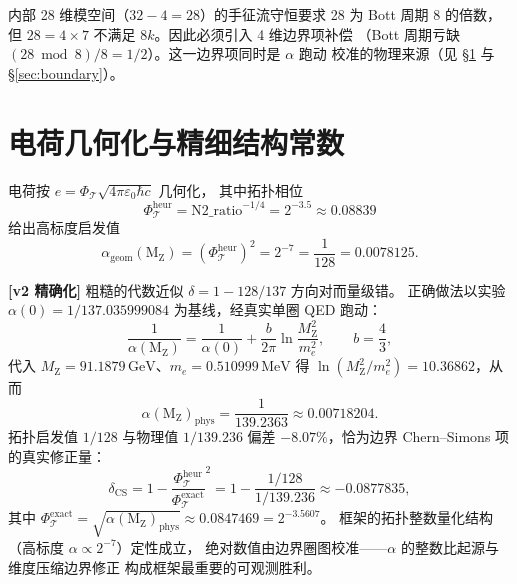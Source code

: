 \documentclass[11pt,a4paper]{article}
\begin{document}
内部 28 维模空间（$32-4=28$）的手征流守恒要求 28 为 Bott 周期 8 的倍数，
但 $28=4\times 7$ 不满足 $8k$。因此必须引入 4 维边界项补偿
（Bott 周期亏缺 $(28\bmod 8)/8=1/2$）。这一边界项同时是 $\alpha$ 跑动
校准的物理来源（见 \S\ref{sec:alpha} 与 \S\ref{sec:boundary}）。

\section{电荷几何化与精细结构常数}
\label{sec:alpha}
电荷按 $e=\Phi_{\mathcal T}\sqrt{4\pi\varepsilon_0\hbar c}$ 几何化，
其中拓扑相位
\begin{equation}
\Phi_{\mathcal T}^{\mathrm{heur}}=\mathrm{N2\_ratio}^{-1/4}=2^{-3.5}\approx 0.08839
\end{equation}
给出高标度启发值
\begin{equation}
\alpha_{\mathrm{geom}}(\mathrm{M_Z})=(\Phi_{\mathcal T}^{\mathrm{heur}})^2
=2^{-7}=\frac{1}{128}=0.0078125.
\end{equation}

\textbf{[v2 精确化]} 粗糙的代数近似 $\delta=1-128/137$ 方向对而量级错。
正确做法以实验 $\alpha(0)=1/137.035999084$ 为基线，经真实单圈 QED 跑动：
\begin{equation}
\frac{1}{\alpha(\mathrm{M_Z})}=\frac{1}{\alpha(0)}+\frac{b}{2\pi}
\ln\frac{M_{\mathrm Z}^2}{m_e^2},\qquad b=\frac{4}{3},
\end{equation}
代入 $M_{\mathrm Z}=91.1879\,\mathrm{GeV}$、$m_e=0.510999\,\mathrm{MeV}$ 得
$\ln(M_{\mathrm Z}^2/m_e^2)=10.36862$，从而
\begin{equation}
\alpha(\mathrm{M_Z})_{\mathrm{phys}}=\frac{1}{139.2363}\approx 0.00718204.
\end{equation}
拓扑启发值 $1/128$ 与物理值 $1/139.236$ 偏差 $-8.07\%$，恰为边界
Chern--Simons 项的真实修正量：
\begin{equation}
\delta_{\mathrm{CS}}=1-\frac{\Phi_{\mathcal T}^{\mathrm{heur}}}{\Phi_{\mathcal T}^{\mathrm{exact}}}^2
=1-\frac{1/128}{1/139.236}\approx \mathbf{-0.0877835},
\end{equation}
其中 $\Phi_{\mathcal T}^{\mathrm{exact}}=\sqrt{\alpha(\mathrm{M_Z})_{\mathrm{phys}}}
\approx 0.0847469=2^{-3.5607}$。
框架的拓扑整数量化结构（高标度 $\alpha\propto 2^{-7}$）定性成立，
绝对数值由边界圈图校准——$\alpha$ 的整数比起源与维度压缩边界修正
构成框架最重要的可观测胜利。
\end{document}
